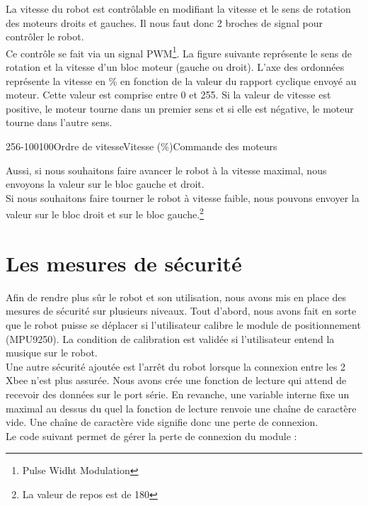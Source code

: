 {La vitesse du robot est contrôlable en modifiant la vitesse et le sens de rotation des moteurs droits et gauches. Il nous faut donc 2 broches de signal pour contrôler le robot.\\

Ce contrôle se fait via un signal PWM\footnote{Pulse Widht Modulation}. 
La figure suivante représente le sens de rotation et la vitesse d'un bloc moteur (gauche ou droit). L'axe des ordonnées représente la vitesse en \% en fonction de la valeur du rapport cyclique envoyé au moteur. Cette valeur est comprise entre 0 et 255.
Si la valeur de vitesse est positive, le moteur tourne dans un premier sens et si elle est négative, le moteur tourne dans l'autre sens.

\label{moteur}
\begin{graphicFigure}{0.6}{0.6}{-1}{256}{-100}{100}{Ordre de vitesse}{Vitesse (\%)}{Commande des moteurs}
\end{graphicFigure}

Aussi, si nous souhaitons faire avancer le robot à la vitesse maximal, nous envoyons la valeur  sur le bloc gauche et droit. \\
Si nous souhaitons faire tourner le robot à vitesse faible, nous pouvons envoyer la valeur  sur le bloc droit et  sur le bloc gauche.\footnote{La valeur de repos est de 180}

\section{Les mesures de sécurité}

Afin de rendre plus sûr le robot et son utilisation, nous avons mis en place des mesures de sécurité sur plusieurs niveaux.
Tout d'abord, nous avons fait en sorte que le robot puisse se déplacer  si l'utilisateur calibre le module de positionnement (MPU9250). La condition de calibration est validée si l'utilisateur entend la musique sur le robot.\\

Une autre sécurité ajoutée est l'arrêt du robot lorsque la connexion entre les 2 Xbee n'est plus assurée.
Nous avons crée une fonction de lecture qui attend de recevoir des données sur le port série. En revanche, une variable interne fixe un  maximal au dessus du quel la fonction de lecture renvoie une chaîne de caractère vide. Une chaîne de caractère vide signifie donc une perte de connexion.\\
Le code suivant permet de gérer la perte de connexion du module : 

}
